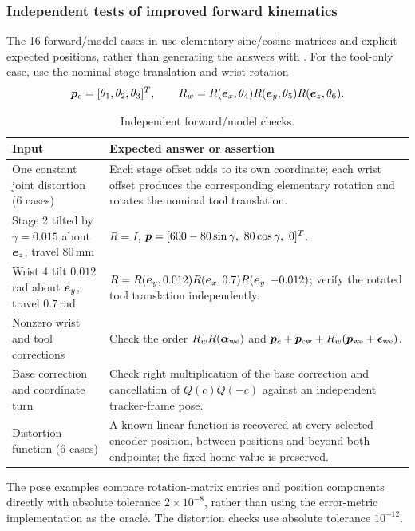 \documentclass[../main.tex]{subfiles}
\begin{document}
\subsubsection{Independent tests of improved forward kinematics}
The 16 forward/model cases in  use elementary sine/cosine matrices and explicit expected positions, rather than generating the answers with . For the tool-only case, use the nominal stage translation and wrist rotation
\begin{equation*}
\bm{p}_c=[\theta_1,\theta_2,\theta_3]^T,\qquad
R_w=R(\bm{e}_x,\theta_4)R(\bm{e}_y,\theta_5)R(\bm{e}_z,\theta_6).
\end{equation*}

\begin{table}[H]
\centering\small
\caption{Independent forward/model checks.}\label{tab:independent-forward}
\begin{tabular}{@{}>{\raggedright\arraybackslash}p{}>{\raggedright\arraybackslash}p{}@{}}
\toprule
Input & Expected answer or assertion \\\midrule
One constant joint distortion (6 cases) & Each stage offset adds to its own coordinate; each wrist offset produces the corresponding elementary rotation and rotates the nominal tool translation. \\
Stage 2 tilted by $\gamma=0.015$ about $\bm{e}_z$, travel $80$\,mm & $R=I$, $\vct{p}=[600-80\sin\gamma,\ 80\cos\gamma,\ 0]^T$. \\
Wrist 4 tilt $0.012$\,rad about $\bm{e}_y$, travel $0.7$\,rad & $R=R(\bm{e}_y,0.012)R(\bm{e}_x,0.7)R(\bm{e}_y,-0.012)$; verify the rotated tool translation independently. \\
Nonzero wrist and tool corrections & Check the order $R_wR(\bm{\alpha}_{\mathrm{we}})$ and $\bm{p}_c+\bm{p}_{\mathrm{cw}}+R_w(\bm{p}_{\mathrm{we}}+\bm{\epsilon}_{\mathrm{we}})$. \\
Base correction and coordinate turn & Check right multiplication of the base correction and cancellation of $Q(c)Q(-c)$ against an independent tracker-frame pose. \\
Distortion function (6 cases) & A known linear function is recovered at every selected encoder position, between positions and beyond both endpoints; the fixed home value is preserved. \\
\bottomrule
\end{tabular}
\end{table}
The pose examples compare rotation-matrix entries and position components directly with absolute tolerance $2\times10^{-8}$, rather than using the error-metric implementation as the oracle. The distortion checks use absolute tolerance $10^{-12}$.
\end{document}

